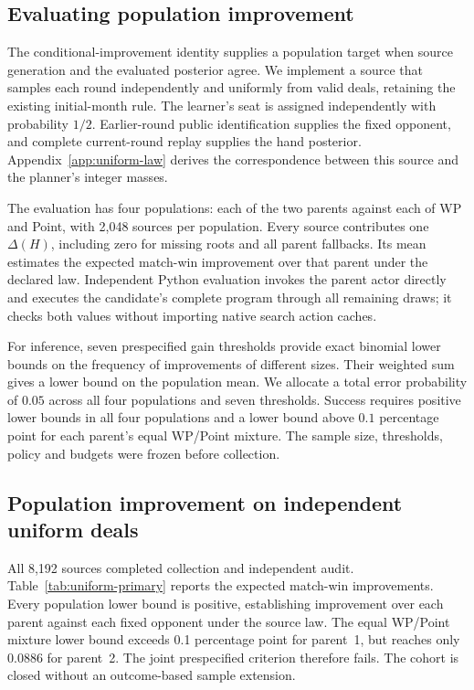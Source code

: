 \subsection{Evaluating population improvement}
\label{sec:uniform-evaluation}
The conditional-improvement identity supplies a population target when source
generation and the evaluated posterior agree. We implement a source that samples
each round independently and uniformly from valid deals, retaining the existing
initial-month rule. The learner's seat is assigned independently with probability
$1/2$. Earlier-round public identification supplies the fixed opponent, and
complete current-round replay supplies the hand posterior. Appendix~\ref{app:uniform-law}
derives the correspondence between this source and the planner's integer masses.

The evaluation has four populations: each of the two parents against each of
WP and Point, with 2,048 sources per population. Every source contributes one
$\Delta(H)$, including zero for missing roots and all parent fallbacks. Its mean
estimates the expected match-win improvement over that parent under the declared
law. Independent Python evaluation invokes the parent actor directly and executes
the candidate's complete program through all remaining draws; it checks both
values without importing native search action caches.

For inference, seven prespecified gain thresholds provide exact binomial lower
bounds on the frequency of improvements of different sizes. Their weighted sum
gives a lower bound on the population mean. We allocate a total error probability
of $0.05$ across all four populations and seven thresholds. Success requires
positive lower bounds in all four populations and a lower bound above
$0.1$ percentage point for each parent's equal WP/Point mixture. The sample
size, thresholds, policy and budgets were frozen before collection.

\subsection{Population improvement on independent uniform deals}
\label{sec:uniform-results}
All 8,192 sources completed collection and independent audit.
Table~\ref{tab:uniform-primary} reports the expected match-win improvements.
Every population lower bound is positive, establishing improvement over each
parent against each fixed opponent under the source law. The equal WP/Point
mixture lower bound exceeds 0.1 percentage point for parent~1, but reaches
only 0.0886 for parent~2. The joint prespecified criterion therefore fails.
The cohort is closed without an outcome-based sample extension.

